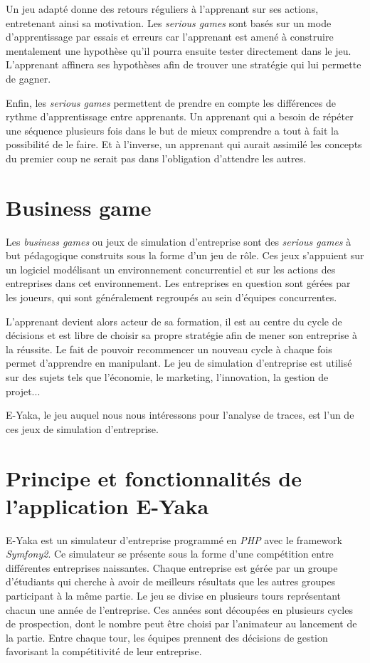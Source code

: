         Un jeu adapté donne des retours réguliers à l’apprenant sur ses actions, entretenant ainsi sa motivation. Les \emph{serious games} sont basés sur un mode d’apprentissage par essais et erreurs car l’apprenant est amené à construire mentalement une hypothèse qu’il pourra ensuite tester directement dans le jeu. L’apprenant affinera ses hypothèses afin de trouver une stratégie qui lui permette de gagner.

        Enfin, les \emph{serious games} permettent de prendre en compte les différences de rythme d’apprentissage entre apprenants. Un apprenant qui a besoin de répéter une séquence plusieurs fois dans le but de mieux comprendre a tout à fait la possibilité de le faire. Et à l’inverse, un apprenant qui aurait assimilé les concepts du premier coup ne serait pas dans l’obligation d’attendre les autres.

    \section{Business game}

        Les \emph{business games} ou jeux de simulation d’entreprise sont des \emph{serious games} à but pédagogique construits sous la forme d’un jeu de rôle. Ces jeux s’appuient sur un logiciel modélisant un environnement concurrentiel et sur les actions des entreprises dans cet environnement. Les entreprises en question sont gérées par les joueurs, qui sont généralement regroupés au sein d’équipes concurrentes.

        L’apprenant devient alors acteur de sa formation, il est au centre du cycle de décisions et est libre de choisir sa propre stratégie afin de mener son entreprise à la réussite. Le fait de pouvoir recommencer un nouveau cycle à chaque fois permet d’apprendre en manipulant. Le jeu de simulation d’entreprise est utilisé sur des sujets tels que l’économie, le marketing, l’innovation, la gestion de projet...

        E-Yaka, le jeu auquel nous nous intéressons pour l’analyse de traces, est l'un de ces jeux de simulation d’entreprise.


    \section{Principe et fonctionnalités de l'application E-Yaka}

        E-Yaka est un simulateur d'entreprise programmé en \emph{PHP} avec le framework \emph{Symfony2}. Ce simulateur se présente sous la forme d'une compétition entre différentes entreprises naissantes. Chaque entreprise est gérée par un groupe d'étudiants qui cherche à avoir de meilleurs résultats que les autres groupes participant à la même partie. Le jeu se divise en plusieurs tours représentant chacun une année de l'entreprise. Ces années sont découpées en plusieurs cycles de prospection, dont le nombre peut être choisi par l'animateur au lancement de la partie. Entre chaque tour, les équipes prennent des décisions de gestion favorisant la compétitivité de leur entreprise.
    
